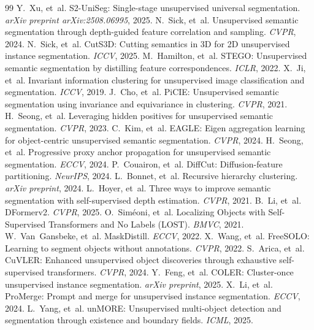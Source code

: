 \documentclass{article}
\begin{document}
\begin{thebibliography}{99}
 Y.~Xu, et~al. S2-UniSeg: Single-stage unsupervised universal segmentation. \emph{arXiv preprint arXiv:2508.06995}, 2025.
 N.~Sick, et~al. Unsupervised semantic segmentation through depth-guided feature correlation and sampling. \emph{CVPR}, 2024.
 N.~Sick, et~al. CutS3D: Cutting semantics in 3D for 2D unsupervised instance segmentation. \emph{ICCV}, 2025.
 M.~Hamilton, et~al. STEGO: Unsupervised semantic segmentation by distilling feature correspondences. \emph{ICLR}, 2022.
 X.~Ji, et~al. Invariant information clustering for unsupervised image classification and segmentation. \emph{ICCV}, 2019.
 J.~Cho, et~al. PiCIE: Unsupervised semantic segmentation using invariance and equivariance in clustering. \emph{CVPR}, 2021.
 H.~Seong, et~al. Leveraging hidden positives for unsupervised semantic segmentation. \emph{CVPR}, 2023.
 C.~Kim, et~al. EAGLE: Eigen aggregation learning for object-centric unsupervised semantic segmentation. \emph{CVPR}, 2024.
 H.~Seong, et~al. Progressive proxy anchor propagation for unsupervised semantic segmentation. \emph{ECCV}, 2024.
 P.~Couairon, et~al. DiffCut: Diffusion-feature partitioning. \emph{NeurIPS}, 2024.
 L.~Bonnet, et~al. Recursive hierarchy clustering. \emph{arXiv preprint}, 2024.
 L.~Hoyer, et~al. Three ways to improve semantic segmentation with self-supervised depth estimation. \emph{CVPR}, 2021.
 B.~Li, et~al. DFormerv2. \emph{CVPR}, 2025.
 O.~Sim\'eoni, et~al. Localizing Objects with Self-Supervised Transformers and No Labels (LOST). \emph{BMVC}, 2021.
 W.~Van~Gansbeke, et~al. MaskDistill. \emph{ECCV}, 2022.
 X.~Wang, et~al. FreeSOLO: Learning to segment objects without annotations. \emph{CVPR}, 2022.
 S.~Arica, et~al. CuVLER: Enhanced unsupervised object discoveries through exhaustive self-supervised transformers. \emph{CVPR}, 2024.
 Y.~Feng, et~al. COLER: Cluster-once unsupervised instance segmentation. \emph{arXiv preprint}, 2025.
 X.~Li, et~al. ProMerge: Prompt and merge for unsupervised instance segmentation. \emph{ECCV}, 2024.
 L.~Yang, et~al. unMORE: Unsupervised multi-object detection and segmentation through existence and boundary fields. \emph{ICML}, 2025.

\end{thebibliography}
\end{document}
